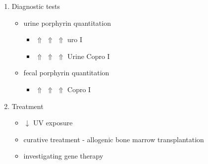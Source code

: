 \documentclass{scrartcl}
\begin{document}
\begin{enumerate}
\item Diagnostic tests
\label{sec:org5002b85}
\begin{itemize}
\item urine porphyrin quantitation
\begin{itemize}
\item \(\Uparrow\) \(\Uparrow\) \(\Uparrow\)  uro I
\item \(\Uparrow\) \(\Uparrow\) \(\Uparrow\) Urine Copro I
\end{itemize}
\item fecal porphyrin quantitation
\begin{itemize}
\item \(\Uparrow\) \(\Uparrow\) \(\Uparrow\) Copro I
\end{itemize}
\end{itemize}

\item Treatment
\label{sec:orgd4c0062}
\begin{itemize}
\item \(\downarrow\) UV exposure
\item curative treatment - allogenic bone marrow transplantation
\item investigating gene therapy
\end{itemize}
\end{enumerate}
\end{document}
